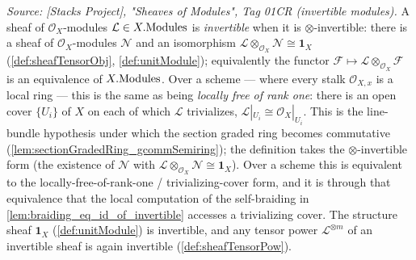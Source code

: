 \begin{definition}

  \label{def:isInvertible}
  \textit{Source: [Stacks Project], "Sheaves of Modules", Tag 01CR (invertible
  modules).}
  A sheaf of \(\mathcal{O}_X\)-modules \(\mathcal{L} \in X.\mathrm{Modules}\) is
  \emph{invertible} when it is \(\otimes\)-invertible: there is a sheaf of
  \(\mathcal{O}_X\)-modules \(\mathcal{N}\) and an isomorphism
  \(\mathcal{L} \otimes_{\mathcal{O}_X} \mathcal{N} \cong \mathbf{1}_X\)
  (\cref{def:sheafTensorObj}, \cref{def:unitModule}); equivalently the functor
  \(\mathcal{F} \mapsto \mathcal{L} \otimes_{\mathcal{O}_X} \mathcal{F}\) is an
  equivalence of \(X.\mathrm{Modules}\). Over a scheme --- where every stalk
  \(\mathcal{O}_{X,x}\) is a local ring --- this is the same as being
  \emph{locally free of rank one}: there is an open cover \(\{U_i\}\) of \(X\) on
  each of which \(\mathcal{L}\) trivializes,
  \(\mathcal{L}|_{U_i} \cong \mathcal{O}_X|_{U_i}\). This is the line-bundle
  hypothesis under which the section graded ring becomes commutative
  (\cref{lem:sectionGradedRing_gcommSemiring}); the definition takes the
  \(\otimes\)-invertible form (the existence of \(\mathcal{N}\) with
  \(\mathcal{L} \otimes_{\mathcal{O}_X} \mathcal{N} \cong \mathbf{1}_X\)). Over a
  scheme this is equivalent to the locally-free-of-rank-one / trivializing-cover
  form, and it is through that equivalence that the local computation of the
  self-braiding in \cref{lem:braiding_eq_id_of_invertible} accesses a trivializing
  cover. The structure sheaf
  \(\mathbf{1}_X\) (\cref{def:unitModule}) is invertible, and any tensor power
  \(\mathcal{L}^{\otimes m}\) of an invertible sheaf is again invertible
  (\cref{def:sheafTensorPow}).
\end{definition}


